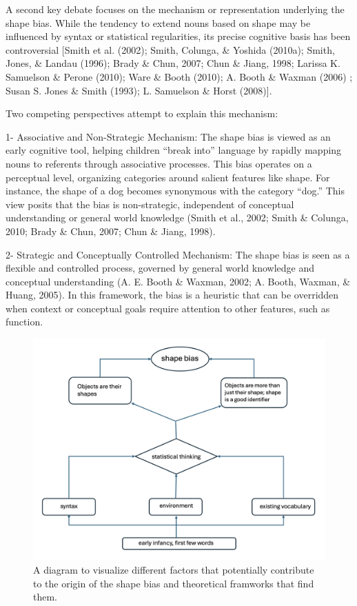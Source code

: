 \documentclass[10pt, letterpaper]{article}
\newenvironment{CodeChunk}{}{}
\begin{document}
A second key debate focuses on the mechanism or representation
underlying the shape bias. While the tendency to extend nouns based on
shape may be influenced by syntax or statistical regularities, its
precise cognitive basis has been controversial {[}Smith et al. (2002);
Smith, Colunga, \& Yoshida (2010a); Smith, Jones, \& Landau (1996);
Brady \& Chun, 2007; Chun \& Jiang, 1998; Larissa K. Samuelson \& Perone
(2010); Ware \& Booth (2010); A. Booth \& Waxman (2006) ; Susan S. Jones
\& Smith (1993); L. Samuelson \& Horst (2008){]}.

Two competing perspectives attempt to explain this mechanism:

1- Associative and Non-Strategic Mechanism: The shape bias is viewed as
an early cognitive tool, helping children ``break into'' language by
rapidly mapping nouns to referents through associative processes. This
bias operates on a perceptual level, organizing categories around
salient features like shape. For instance, the shape of a dog becomes
synonymous with the category ``dog.'' This view posits that the bias is
non-strategic, independent of conceptual understanding or general world
knowledge (Smith et al., 2002; Smith \& Colunga, 2010; Brady \& Chun,
2007; Chun \& Jiang, 1998).

2- Strategic and Conceptually Controlled Mechanism: The shape bias is
seen as a flexible and controlled process, governed by general world
knowledge and conceptual understanding (A. E. Booth \& Waxman, 2002; A.
Booth, Waxman, \& Huang, 2005). In this framework, the bias is a
heuristic that can be overridden when context or conceptual goals
require attention to other features, such as function.

\begin{CodeChunk}
\begin{figure}[tb]
\includegraphics[width=1\linewidth]{conceptual_diagram} \caption[A diagram to visualize different factors that potentially contribute to the origin of the shape bias and theoretical framworks that find them]{A diagram to visualize different factors that potentially contribute to the origin of the shape bias and theoretical framworks that find them.}\label{fig:prisma }
\end{figure}
\end{CodeChunk}
\end{document}
